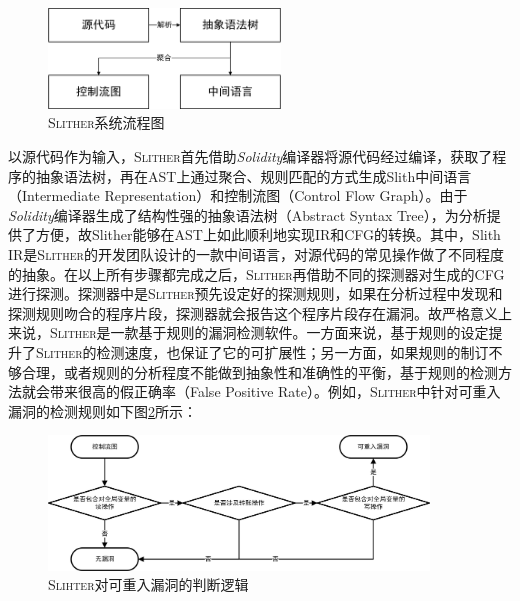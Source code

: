\begin{figure}[h]
\vspace{+2mm}
  \centering
  \includegraphics[width=0.55\textwidth]{figures/slither_process.png}
  \caption{\textsc{Slither}系统流程图}
  \vspace{-5mm}
  \label{fig:slither_proccess}
\end{figure}

以源代码作为输入，\textsc{Slither}首先借助\emph{Solidity}编译器将源代码经过编译，获取了程序的抽象语法树，再在AST上通过聚合、规则匹配的方式生成Slith中间语言（Intermediate Representation）和控制流图（Control Flow Graph）。由于\emph{Solidity}编译器生成了结构性强的抽象语法树（Abstract Syntax Tree），为分析提供了方便，故Slither能够在AST上如此顺利地实现IR和CFG的转换。其中，Slith IR是\textsc{Slither}的开发团队设计的一款中间语言，对源代码的常见操作做了不同程度的抽象。在以上所有步骤都完成之后，\textsc{Slither}再借助不同的探测器对生成的CFG进行探测。探测器中是\textsc{Slither}预先设定好的探测规则，如果在分析过程中发现和探测规则吻合的程序片段，探测器就会报告这个程序片段存在漏洞。故严格意义上来说，\textsc{Slither}是一款基于规则的漏洞检测软件。一方面来说，基于规则的设定提升了\textsc{Slither}的检测速度，也保证了它的可扩展性；另一方面，如果规则的制订不够合理，或者规则的分析程度不能做到抽象性和准确性的平衡，基于规则的检测方法就会带来很高的假正确率（False Positive Rate）。例如，\textsc{Slither}中针对可重入漏洞的检测规则如下图\ref{fig:slither_reentrancy_flow}所示：

\begin{figure}
\vspace{+2mm}
  \centering
  \includegraphics[width=0.9\textwidth]{figures/slither_reentrancy_flow.png}
  \caption{\textsc{Slihter}对可重入漏洞的判断逻辑}
  \label{fig:slither_reentrancy_flow}
\vspace{-5mm}
\end{figure}


